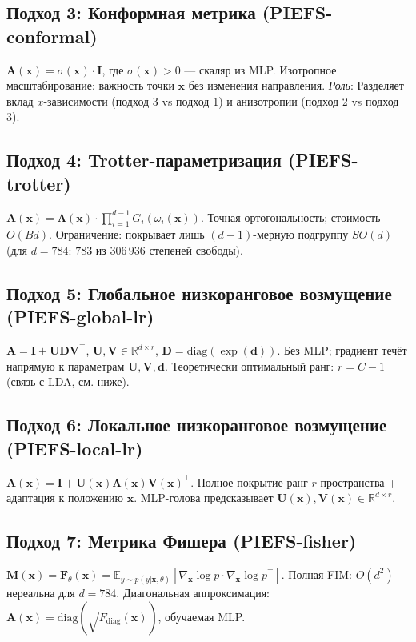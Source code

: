 \documentclass[14pt, a4paper, oneside]{extreport}
\theoremstyle{plain}
\theoremstyle{definition}
\begin{document}
\subsection{Подход 3: Конформная метрика (PIEFS-conformal)}
$\mathbf{A}(\mathbf{x}) = \sigma(\mathbf{x}) \cdot \mathbf{I}$, где $\sigma(\mathbf{x}) > 0$ — скаляр из MLP.
Изотропное масштабирование: важность точки $\mathbf{x}$ без изменения направления.
\emph{Роль}: Разделяет вклад $x$-зависимости (подход 3 vs подход 1) и анизотропии (подход 2 vs подход 3).

\subsection{Подход 4: Trotter-параметризация (PIEFS-trotter)}
$\mathbf{A}(\mathbf{x}) = \boldsymbol{\Lambda}(\mathbf{x}) \cdot \prod_{i=1}^{d-1} G_i(\omega_i(\mathbf{x}))$.
Точная ортогональность; стоимость $O(Bd)$. Ограничение: покрывает лишь $(d-1)$-мерную подгруппу $SO(d)$
(для $d=784$: $783$ из $306\,936$ степеней свободы).

\subsection{Подход 5: Глобальное низкоранговое возмущение (PIEFS-global-lr)}
$\mathbf{A} = \mathbf{I} + \mathbf{U}\mathbf{D}\mathbf{V}^\top$, $\mathbf{U},\mathbf{V}\in\mathbb{R}^{d\times r}$, $\mathbf{D} = \mathrm{diag}(\exp(\mathbf{d}))$.
Без MLP; градиент течёт напрямую к параметрам $\mathbf{U},\mathbf{V},\mathbf{d}$.
Теоретически оптимальный ранг: $r = C-1$ (связь с LDA, см. ниже).

\subsection{Подход 6: Локальное низкоранговое возмущение (PIEFS-local-lr)}
$\mathbf{A}(\mathbf{x}) = \mathbf{I} + \mathbf{U}(\mathbf{x})\boldsymbol{\Lambda}(\mathbf{x})\mathbf{V}(\mathbf{x})^\top$.
Полное покрытие ранг-$r$ пространства + адаптация к положению $\mathbf{x}$.
MLP-голова предсказывает $\mathbf{U}(\mathbf{x}),\mathbf{V}(\mathbf{x})\in\mathbb{R}^{d\times r}$.

\subsection{Подход 7: Метрика Фишера (PIEFS-fisher)}
$\mathbf{M}(\mathbf{x}) = \mathbf{F}_\theta(\mathbf{x}) = \mathbb{E}_{y\sim p(y|\mathbf{x},\theta)}[\nabla_{\mathbf{x}}\log p \cdot \nabla_{\mathbf{x}}\log p^\top]$.
Полная FIM: $O(d^2)$ — нереальна для $d=784$.
Диагональная аппроксимация: $\mathbf{A}(\mathbf{x}) = \mathrm{diag}(\sqrt{F_{\mathrm{diag}}(\mathbf{x})})$, обучаемая MLP.
\end{document}
